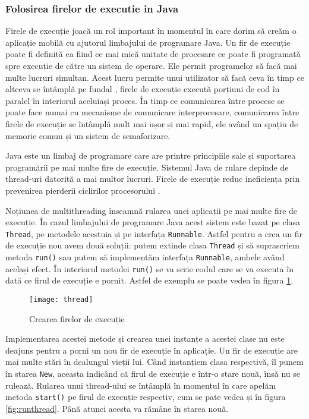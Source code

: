 \documentclass[../IoMusT.tex]{subfiles}
\begin{document}
\subsubsection{Folosirea firelor de executie in Java}
Firele de execuție joacă un rol important în momentul în care dorim să creăm o aplicație mobilă cu ajutorul limbajului de programare Java. Un fir de execuție poate fi definită ca fiind ce mai mică  unitate de procesare ce poate fi programată spre execuție de către un sistem de operare. Ele permit programelor să facă mai multe lucruri simultan. Acest lucru permite unui utilizator să facă ceva în timp ce altceva se întâmplă pe fundal \cite{articleThread}, firele de execuție execută porțiuni de cod  în paralel în interiorul aceluiași proces. În timp ce comunicarea între procese se poate face numai cu mecanisme de comunicare interprocesare, comunicarea între firele de execuție se întâmplă mult mai ușor și mai rapid, ele având un spațiu de memorie comun și un sistem de semaforizare.
\\
\par Java este un limbaj de programare care are printre principiile sale și suportarea programării pe mai multe fire de execuție. Sistemul Java de rulare depinde de thread-uri datorită a mai multor lucruri. Firele de execuție reduc ineficiența prin prevenirea pierderii ciclirilor  procesorului \cite{Thread}.
\\ 
\par Noțiunea de multithreading înseamnă rularea unei aplicații pe mai multe fire de execuție. În cazul limbajului de programare Java acest sistem este bazat pe clasa \verb|Thread|, pe metodele acestuia și pe interfața \verb|Runnable|. Astfel pentru a crea un fir de execuție nou avem două soluții: putem extinde clasa \verb|Thread| și să suprascriem metoda \verb|run()| sau putem să implementăm interfața \verb|Runnable|, ambele având același efect. În interiorul metodei \verb|run()| se va scrie codul care se va executa în dată ce firul de execuție e pornit. Astfel de exemplu se poate vedea în figura \ref{fig:thread}.
\begin{figure}[h]
\centering
\texttt{[image: thread]}
\caption{Crearea firelor de execuție}
\label{fig:thread}
\end{figure}
Implementarea acestei metode și crearea unei instanțe a acestei clase nu este deajuns pentru a porni un nou fir de execuție în aplicație. Un fir de execuție are mai multe stări în dealungul vieții lui. Când instanțiem clasa respectivă, îl punem în starea \verb|New|, aceasta indicând că firul de execuție e într-o stare nouă, însă nu se rulează. Rularea unui thread-ului se întâmplă în momentul în care apelăm metoda \verb|start()| pe firul de execuție respectiv, cum se pate vedea și în figura \ref{fig:runthread}. Până atunci acesta va rămâne în starea nouă.
\end{document}
